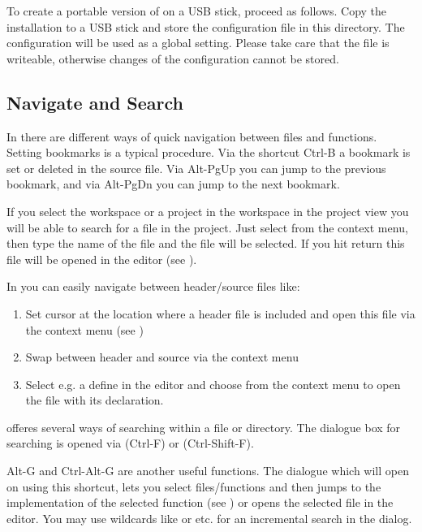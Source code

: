 To create a portable version of \codeblocks on a USB stick, proceed as follows. Copy the \codeblocks installation to a USB stick and store the configuration file  in this directory. The configuration will be used as a global setting. Please take care that the file is writeable, otherwise changes of the configuration cannot be stored.

\subsection{Navigate and Search}

In \codeblocks there are different ways of quick navigation between files and functions. Setting bookmarks is a typical procedure. Via the shortcut Ctrl-B a bookmark is set or deleted in the source file. Via Alt-PgUp you can jump to the previous bookmark, and via Alt-PgDn you can jump to the next bookmark.

If you select the workspace or a project in the workspace in the project view you will be able to search for a file in the project. Just select  from the context menu, then type the name of the file and the file will be selected. If you hit return this file will be opened in the editor (see ).


In \codeblocks you can easily navigate between header/source files like:

\begin{enumerate}
\item Set cursor at the location where a header file is included and open this file via the context menu  (see )
\item Swap between header and source via the context menu 
\item Select e.g. a define in the editor and choose  from the context menu to open the file with its declaration.
\end{enumerate}


\codeblocks offeres several ways of searching within a file or directory. The dialogue box for searching is opened via  (Ctrl-F) or  (Ctrl-Shift-F).

Alt-G and Ctrl-Alt-G are another useful functions. The dialogue which will open on using this shortcut, lets you select files/functions and then jumps to the implementation of the selected function (see ) or opens the selected file in the editor. You may use wildcards like \codeline{*} or  etc. for an incremental search in the dialog.

